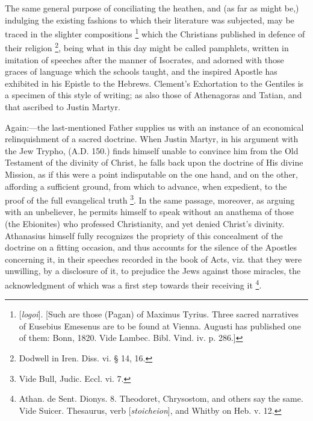 The same general purpose of conciliating the heathen, and (as far
as might be,) indulging the existing fashions to which their
literature was subjected, may be traced in the slighter compositions \footnote{[\emph{logoi}]. [Such are those (Pagan) of
Maximus Tyrius. Three sacred narratives of Eusebius Emesenus are to be
found at Vienna. Augusti has published one of them: Bonn, 1820. Vide
Lambec. Bibl. Vind. iv. p. 286.]} which the Christians published in defence of their religion \footnote{Dodwell in Iren. Diss. vi. § 14, 16.}, being what in this day might be called pamphlets, written in
imitation of speeches after the manner of Isocrates, and adorned with
those graces of language which the schools taught, and the inspired
Apostle has exhibited in his Epistle to the Hebrews. Clement's
Exhortation to the Gentiles is a specimen of this style of writing; as
also those of Athenagoras and Tatian, and that ascribed to Justin
Martyr.

Again:—the last-mentioned Father supplies us with an instance of
an economical relinquishment of a sacred doctrine. When Justin Martyr,
in his argument with the Jew Trypho, (A.D. 150.)
finds himself unable to convince him from the Old Testament of the
divinity of Christ, he falls back upon the doctrine of His divine
Mission, as if this were a point indisputable on the one hand,
and on the other, affording a sufficient ground, from which to
advance, when expedient, to the proof of the full evangelical truth \footnote{Vide Bull, Judic. Eccl. vi. 7.}. In the same passage, moreover, as arguing with an unbeliever,
he permits himself to speak without an anathema of those (the
Ebionites) who professed Christianity, and yet denied Christ's
divinity. Athanasius himself fully recognizes the propriety of this
concealment of the doctrine on a fitting occasion, and thus accounts
for the silence of the Apostles concerning it, in their speeches
recorded in the book of Acts, viz. that they were unwilling, by a
disclosure of it, to prejudice the Jews against those miracles, the
acknowledgment of which was a first step towards their receiving it \footnote{Athan. de Sent. Dionys. 8. Theodoret,
Chrysostom, and others say the same. Vide Suicer. Thesaurus, verb [\emph{stoicheion}],
and Whitby on Heb. v. 12.}.

